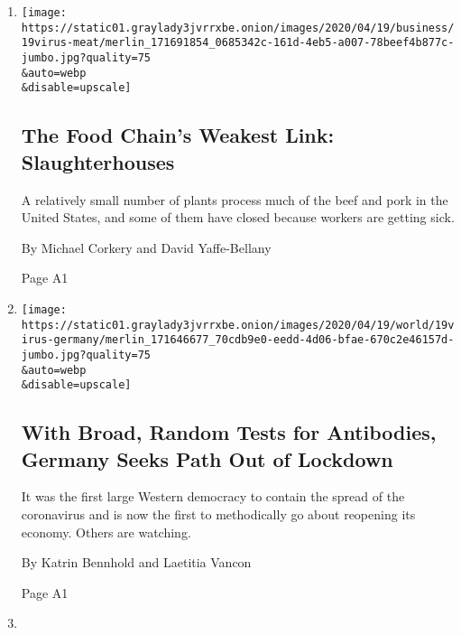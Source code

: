 \begin{enumerate}
\def\labelenumi{\arabic{enumi}.}
\item
  \href{/2020/04/18/business/coronavirus-meat-slaughterhouses.html}{}

  \texttt{[image: https://static01.graylady3jvrrxbe.onion/images/2020/04/19/business/19virus-meat/merlin\_171691854\_0685342c-161d-4eb5-a007-78beef4b877c-jumbo.jpg?quality=75\\\&auto=webp\\\&disable=upscale]}

  \hypertarget{the-food-chains-weakest-link-slaughterhouses}{%
  \subsection{The Food Chain's Weakest Link:
  Slaughterhouses}\label{the-food-chains-weakest-link-slaughterhouses}}

  A relatively small number of plants process much of the beef and pork
  in the United States, and some of them have closed because workers are
  getting sick.

  By Michael Corkery and David Yaffe-Bellany

  Page A1
\item
  \href{/2020/04/18/world/europe/with-broad-random-tests-for-antibodies-germany-seeks-path-out-of-lockdown.html}{}

  \texttt{[image: https://static01.graylady3jvrrxbe.onion/images/2020/04/19/world/19virus-germany/merlin\_171646677\_70cdb9e0-eedd-4d06-bfae-670c2e46157d-jumbo.jpg?quality=75\\\&auto=webp\\\&disable=upscale]}

  \hypertarget{with-broad-random-tests-for-antibodies-germany-seeks-path-out-of-lockdown}{%
  \subsection{With Broad, Random Tests for Antibodies, Germany Seeks
  Path Out of
  Lockdown}\label{with-broad-random-tests-for-antibodies-germany-seeks-path-out-of-lockdown}}

  It was the first large Western democracy to contain the spread of the
  coronavirus and is now the first to methodically go about reopening
  its economy. Others are watching.

  By Katrin Bennhold and Laetitia Vancon

  Page A1
\item
  \href{/interactive/2020/04/14/science/coronavirus-transmission-cough-6-feet-ar-ul.html}{}

  \hypertarget{this-3-d-simulation-shows-why-social-distancing-is-so-important}{%
}
\end{enumerate}
